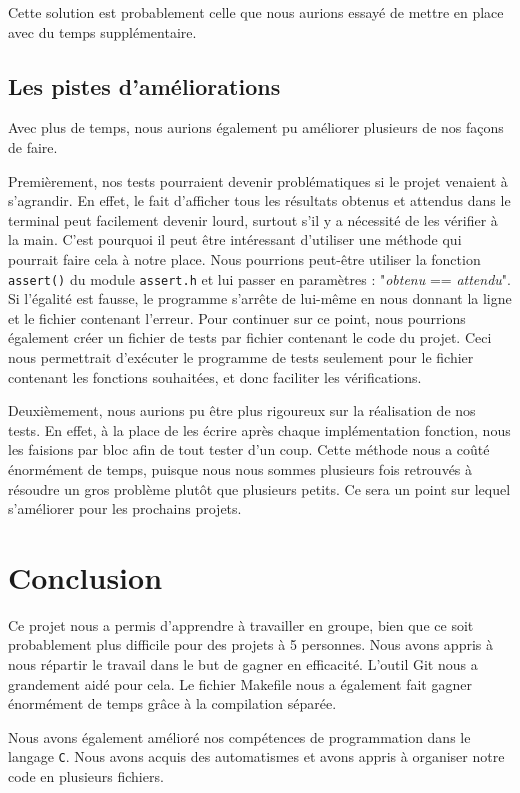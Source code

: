 \documentclass[a4paper]{article}
\begin{document}
Cette solution est probablement celle que nous aurions essayé de mettre en place avec du temps supplémentaire.

\subsection{Les pistes d'améliorations}
\label{amélio}

Avec plus de temps, nous aurions également pu améliorer plusieurs de nos façons de faire.

Premièrement, nos tests pourraient devenir problématiques si le projet venaient à s'agrandir. En effet, le fait d'afficher tous les résultats obtenus et attendus dans le terminal peut facilement devenir lourd, surtout s'il y a nécessité de les vérifier à la main. C'est pourquoi il peut être intéressant d'utiliser une méthode qui pourrait faire cela à notre place. Nous pourrions peut-être utiliser la fonction \verb|assert()| du module \verb|assert.h| et lui passer en paramètres : "\emph{obtenu} == \emph{attendu}". Si l'égalité est fausse, le programme s'arrête de lui-même en nous donnant la ligne et le fichier contenant l'erreur. Pour continuer sur ce point, nous pourrions également créer un fichier de tests par fichier contenant le code du projet. Ceci nous permettrait d'exécuter le programme de tests seulement pour le fichier contenant les fonctions souhaitées, et donc faciliter les vérifications.

Deuxièmement, nous aurions pu être plus rigoureux sur la réalisation de nos tests. En effet, à la place de les écrire après chaque implémentation fonction, nous les faisions par bloc afin de tout tester d'un coup. Cette méthode nous a coûté énormément de temps, puisque nous nous sommes plusieurs fois retrouvés à résoudre un gros problème plutôt que plusieurs petits. Ce sera un point sur lequel s'améliorer pour les prochains projets.

\section{Conclusion}

Ce projet nous a permis d'apprendre à travailler en groupe, bien que ce soit probablement plus difficile pour des projets à 5 personnes. Nous avons appris à nous répartir le travail dans le but de gagner en efficacité. L'outil Git nous a grandement aidé pour cela. Le fichier Makefile nous a également fait gagner énormément de temps grâce à la compilation séparée.

Nous avons également amélioré nos compétences de programmation dans le langage \verb|C|. Nous avons acquis des automatismes et avons appris à organiser notre code en plusieurs fichiers.
\end{document}

